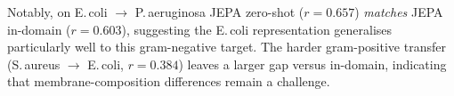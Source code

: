 Notably, on E.\,coli $\to$ P.\,aeruginosa JEPA zero-shot ($r = 0.657$)
\emph{matches} JEPA in-domain ($r = 0.603$), suggesting the E.\,coli
representation generalises particularly well to this gram-negative target.
The harder gram-positive transfer (S.\,aureus $\to$ E.\,coli, $r = 0.384$)
leaves a larger gap versus in-domain, indicating that membrane-composition
differences remain a challenge.

